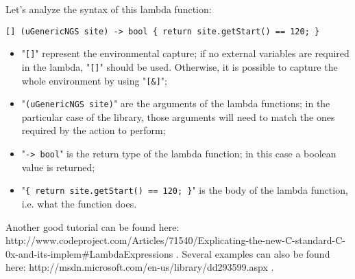 \documentclass[letterpaper,10pt]{article}
\begin{document}
Let's analyze the syntax of this lambda function:
\begin{verbatim}
[] (uGenericNGS site) -> bool { return site.getStart() == 120; }
\end{verbatim}
\begin{itemize}
 \item "\verb+[]+" represent the environmental capture; if no external variables are required in the lambda, "\verb+[]+" should be used. Otherwise, it is possible to capture the whole environment by using "\verb+[&]+";
 \item "\verb+(uGenericNGS site)+" are the arguments of the lambda functions; in the particular case of the library, those arguments will need to match the ones required by the action to perform;
 \item "\verb+-> bool+" is the return type of the lambda function; in this case a boolean value is returned;
 \item "\verb+{ return site.getStart() == 120; }+" is the body of the lambda function, i.e. what the function does.
\end{itemize}

Another good tutorial can be found here: http://www.codeproject.com/Articles/71540/Explicating-the-new-C-standard-C-0x-and-its-implem\#LambdaExpressions . Several examples can also be found here: http://msdn.microsoft.com/en-us/library/dd293599.aspx .
\end{document}
